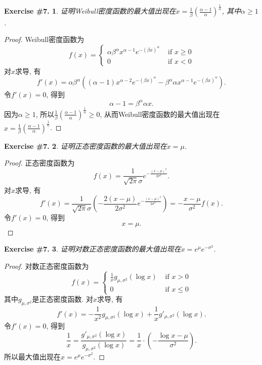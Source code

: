 \documentclass[UTF8, a4paper]{article}
\newtheorem{exercise}{Exercise \#7.}
\begin{document}
\begin{framed}
\begin{exercise}
证明Weibull密度函数的最大值出现在$x = \frac{1}{\beta}\left(\frac{\alpha - 1}{\alpha}\right)^{\frac{1}{\alpha}}$, 其中$\alpha \geq 1$.
\end{exercise}
\end{framed}

\begin{proof}
Weibull密度函数为
$$
f(x)= \begin{cases}\alpha \beta^\alpha x^{\alpha-1} e^{-(\beta x)^\alpha} & \text { if } x \geq 0 \\ 0 & \text { if } x<0\end{cases}
$$
对\(x\)求导, 有
$$
f'(x) = \alpha \beta^\alpha \left((\alpha - 1)x^{\alpha - 2}e^{-(\beta x)^\alpha} - \beta^\alpha \alpha x^{\alpha - 1}e^{-(\beta x)^\alpha}\right).
$$
令\(f'(x) = 0\), 得到
$$
\alpha - 1 = \beta^\alpha \alpha x.
$$
因为\(\alpha \geq 1\), 所以\(\frac{1}{\beta}\left(\frac{\alpha - 1}{\alpha}\right)^{\frac{1}{\alpha}} \geq 0\), 从而Weibull密度函数的最大值出现在\(x = \frac{1}{\beta}\left(\frac{\alpha - 1}{\alpha}\right)^{\frac{1}{\alpha}}\).

\end{proof}

\begin{framed}
\begin{exercise}
证明正态密度函数的最大值出现在$x = \mu$.
\end{exercise}
\end{framed}

\begin{proof}
正态密度函数为
$$
f(x) = \frac{1}{\sqrt{2\pi}\sigma}e^{-\frac{(x - \mu)^2}{2\sigma^2}}.
$$
对\(x\)求导, 有
$$
f'(x) = \frac{1}{\sqrt{2\pi}\sigma}\left(-\frac{2(x - \mu)}{2\sigma^2}e^{-\frac{(x - \mu)^2}{2\sigma^2}}\right) = -\frac{x - \mu}{\sigma^2}f(x).
$$
令\(f'(x) = 0\), 得到
$$
x = \mu.
$$
\end{proof}


\begin{framed}
\begin{exercise}
证明对数正态密度函数的最大值出现在$x = e^{\mu}e^{- \sigma^2}$.
\end{exercise}
\end{framed}

\begin{proof}
对数正态密度函数为
$$
f(x)= \begin{cases}\frac{1}{x} g_{\mu, \sigma^2}(\log x) & \text { if } x>0 \\ 0 & \text { if } x \leq 0\end{cases}
$$
其中\(g_{\mu, \sigma^2}\)是正态密度函数. 对\(x\)求导, 有
$$
f'(x) = -\frac{1}{x^2} g_{\mu, \sigma^2}(\log x) + \frac{1}{x} g'_{\mu, \sigma^2}(\log x).
$$
令\(f'(x) = 0\), 得到
$$
\frac{1}{x} = \frac{g'_{\mu, \sigma^2}(\log x)}{g_{\mu, \sigma^2}(\log x)} = \frac{1}{x} \cdot\left(- \frac{\log x - \mu}{\sigma^2}\right).
$$
所以最大值出现在\(x = e^{\mu}e^{- \sigma^2}\).

\end{proof}
\end{document}

